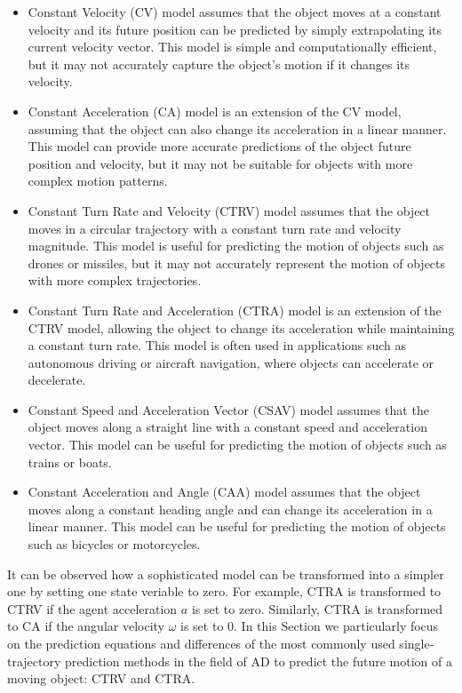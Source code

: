 \begin{itemize}
	
	\item Constant Velocity (CV) model assumes that the object moves at a constant velocity and its future position can be predicted by simply extrapolating its current velocity vector. This model is simple and computationally efficient, but it may not accurately capture the object's motion if it changes its velocity.
	
	\item Constant Acceleration (CA) model is an extension of the CV model, assuming that the object can also change its acceleration in a linear manner. This model can provide more accurate predictions of the object future position and velocity, but it may not be suitable for objects with more complex motion patterns.
	
	\item Constant Turn Rate and Velocity (CTRV) model assumes that the object moves in a circular trajectory with a constant turn rate and velocity magnitude. This model is useful for predicting the motion of objects such as drones or missiles, but it may not accurately represent the motion of objects with more complex trajectories.
	
	\item Constant Turn Rate and Acceleration (CTRA) model is an extension of the CTRV model, allowing the object to change its acceleration while maintaining a constant turn rate. This model is often used in applications such as autonomous driving or aircraft navigation, where objects can accelerate or decelerate.
	
	\item Constant Speed and Acceleration Vector (CSAV) model assumes that the object moves along a straight line with a constant speed and acceleration vector. This model can be useful for predicting the motion of objects such as trains or boats.
	
	\item Constant Acceleration and Angle (CAA) model assumes that the object moves along a constant heading angle and can change its acceleration in a linear manner. This model can be useful for predicting the motion of objects such as bicycles or motorcycles.
	
\end{itemize}

It can be observed how a sophisticated model can be transformed into a simpler one by setting one state veriable to zero. For example, CTRA is transformed to CTRV if the agent acceleration $a$ is set to zero. Similarly, CTRA is transformed to CA if the angular velocity $\omega$ is set to 0. In this Section we particularly focus on the prediction equations and differences of the most commonly used single-trajectory prediction methods in the field of \ac{AD} to predict the future motion of a moving object: CTRV and CTRA.

